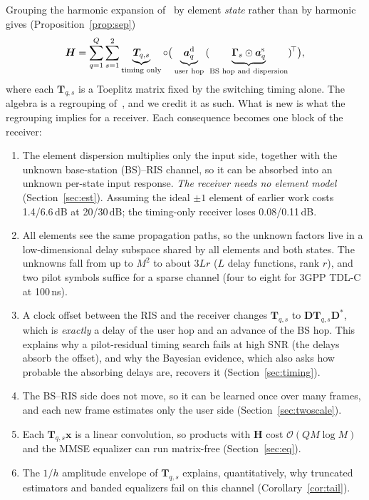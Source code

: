 Grouping the harmonic expansion of~\cite{iudice2026} by element \emph{state} rather
than by harmonic gives (Proposition~\ref{prop:sep})
\begin{equation*}
\bm H=\sum_{q=1}^{Q}\sum_{s=1}^{2}\underbrace{\bm T_{q,s}}_{\text{timing only}}\circ
\big(\underbrace{\bm a^{\rm d}_q}_{\text{user hop}}\,
(\underbrace{\bm\Gamma_s\odot\bm a^{\rm s}_q}_{\text{BS hop and dispersion}})^{\!\top}\big),
\end{equation*}
where each $\bm T_{q,s}$ is a Toeplitz matrix fixed by the switching timing alone.
The algebra is a regrouping of~\cite[eq.~(5)]{iudice2026}, and we credit it as such.
What is new is what the regrouping implies for a receiver. Each consequence becomes
one block of the receiver:
\begin{enumerate}
\item The element dispersion multiplies only the input side, together with the
unknown base-station (BS)--RIS channel, so it can be absorbed into an unknown
per-state input response. \emph{The receiver needs no element model}
(Section~\ref{sec:est}). Assuming the ideal $\pm1$ element of earlier work costs
1.4/6.6\,dB at 20/30\,dB; the timing-only receiver loses 0.08/0.11\,dB.
\item All elements see the same propagation paths, so the unknown factors live in a
low-dimensional delay subspace shared by all elements and both states. The unknowns
fall from up to $M^2$ to about $3Lr$ ($L$ delay functions, rank $r$), and two pilot
symbols suffice for a sparse channel (four to eight for 3GPP TDL-C at 100\,ns).
\item A clock offset between the RIS and the receiver changes $\bm T_{q,s}$ to
$\bm D\bm T_{q,s}\bm D^{*}$, which is \emph{exactly} a delay of the user hop and an
advance of the BS hop. This explains why a pilot-residual timing search fails at high
SNR (the delays absorb the offset), and why the Bayesian evidence, which also asks how
probable the absorbing delays are, recovers it (Section~\ref{sec:timing}).
\item The BS--RIS side does not move, so it can be learned once over many frames, and
each new frame estimates only the user side (Section~\ref{sec:twoscale}).
\item Each $\bm T_{q,s}\bm x$ is a linear convolution, so products with $\bm H$ cost
$\mathcal O(QM\log M)$ and the MMSE equalizer can run matrix-free
(Section~\ref{sec:eq}).
\item The $1/h$ amplitude envelope of $\bm T_{q,s}$ explains, quantitatively, why
truncated estimators and banded equalizers fail on this channel
(Corollary~\ref{cor:tail}).
\end{enumerate}

